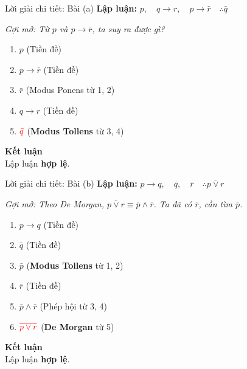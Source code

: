 \documentclass[aspectratio=169, 11pt]{beamer}
\begin{document}
\begin{frame}{Lời giải chi tiết: Bài (a)}
\textbf{Lập luận:} $p,\quad q \rightarrow r,\quad p \rightarrow \bar{r}\quad \therefore \bar{q}$

\vspace{0.2cm}
\textit{Gợi mở: Từ $p$ và $p \rightarrow \bar{r}$, ta suy ra được gì?}

\vspace{0.25cm}
\begin{enumerate}
  \item[\textcolor{uitblue}{1.}] $p$ \hfill (Tiền đề)
  \item[\textcolor{uitblue}{2.}] $p \rightarrow \bar{r}$ \hfill (Tiền đề)
  \item[\textcolor{uitblue}{3.}] $\bar{r}$ \hfill (Modus Ponens từ 1, 2)
  \item[\textcolor{uitblue}{4.}] $q \rightarrow r$ \hfill (Tiền đề)
  \item[\textcolor{uitblue}{5.}] $\textcolor{red}{\bar{q}}$ \hfill (\textbf{Modus Tollens} từ 3, 4)
\end{enumerate}

\vspace{0.25cm}
{\large\textbf{\color{red}Kết luận}}\\
\vspace{0.05cm}
Lập luận \textbf{hợp lệ}.
\end{frame}

\begin{frame}{Lời giải chi tiết: Bài (b)}
\textbf{Lập luận:} $p \rightarrow q,\quad \bar{q},\quad \bar{r}\quad \therefore \overline{p \lor r}$

\vspace{0.2cm}
\textit{Gợi mở: Theo De Morgan, $\overline{p \lor r} \equiv \bar{p} \land \bar{r}$. Ta đã có $\bar{r}$, cần tìm $\bar{p}$.}

\vspace{0.25cm}
\begin{enumerate}
  \item[\textcolor{uitblue}{1.}] $p \rightarrow q$ \hfill (Tiền đề)
  \item[\textcolor{uitblue}{2.}] $\bar{q}$ \hfill (Tiền đề)
  \item[\textcolor{uitblue}{3.}] $\bar{p}$ \hfill (\textbf{Modus Tollens} từ 1, 2)
  \item[\textcolor{uitblue}{4.}] $\bar{r}$ \hfill (Tiền đề)
  \item[\textcolor{uitblue}{5.}] $\bar{p} \land \bar{r}$ \hfill (Phép hội từ 3, 4)
  \item[\textcolor{uitblue}{6.}] $\textcolor{red}{\overline{p \lor r}}$ \hfill (\textbf{De Morgan} từ 5)
\end{enumerate}

\vspace{0.25cm}
{\large\textbf{\color{red}Kết luận}}\\
\vspace{0.05cm}
Lập luận \textbf{hợp lệ}.
\end{frame}
\end{document}
